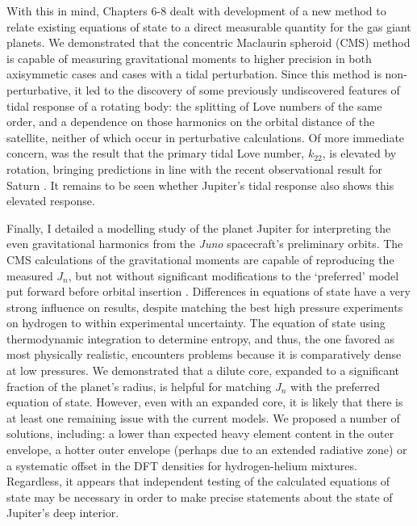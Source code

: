 With this in mind, Chapters 6-8 dealt with development of a new method to relate
existing equations of state to a direct measurable quantity for the gas giant
planets. We demonstrated that the concentric Maclaurin spheroid (CMS) method is
capable of measuring gravitational moments to higher precision in both axisymmetic
cases and cases with a tidal perturbation. Since this method is non-perturbative, it
led to the discovery of some previously undiscovered features of tidal response of a
rotating body: the splitting of Love numbers of the same order, and a dependence on
those harmonics on the orbital distance of the satellite, neither of which occur in
perturbative calculations. Of more immediate concern, was the result that the primary
tidal Love number, $k_{22}$, is elevated by rotation, bringing predictions in line
with the recent observational result for Saturn \citep{lainey2016}. It remains to be
seen whether Jupiter's tidal response also shows this elevated response.

Finally, I detailed a modelling study of the planet Jupiter for interpreting the even
gravitational harmonics from the \textit{Juno} spacecraft's preliminary orbits. The
CMS calculations of the gravitational moments are capable of reproducing the measured
$J_n$, but not without significant modifications to the `preferred' model put forward
before orbital insertion \citep{hubbard2016}. Differences in equations of state have
a very strong influence on results, despite matching the best high pressure
experiments on hydrogen to within experimental uncertainty. The equation of state
using thermodynamic integration to determine entropy, and thus, the one favored as
most physically realistic, encounters problems because it is comparatively dense at
low pressures. We demonstrated that a dilute core, expanded to a significant fraction
of the planet's radius, is helpful for matching $J_n$ with the preferred equation of
state. However, even with an expanded core, it is likely that there is at least one
remaining issue with the current models. We proposed a number of solutions,
including: a lower than expected heavy element content in the outer envelope, a
hotter outer envelope (perhaps due to an extended radiative zone) or a systematic
offset in the DFT densities for hydrogen-helium mixtures. Regardless, it appears that
independent testing of the calculated equations of state may be necessary in order to
make precise statements about the state of Jupiter's deep interior.
